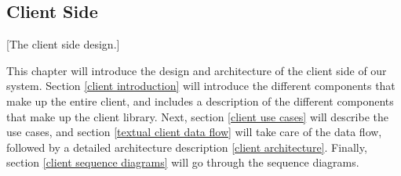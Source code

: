\subsection{Client Side}\label{client side}
[The client side design.]

This chapter will introduce the design and architecture of the client side of our system. Section \ref{client introduction} will introduce the different components that make up the entire client, and includes a description of the different components that make up the client library. Next, section \ref{client use cases} will describe the use cases, and section \ref{textual client data flow} will take care of the data flow, followed by a detailed architecture description \ref{client architecture}. Finally, section \ref{client sequence diagrams} will go through the sequence diagrams.
		
